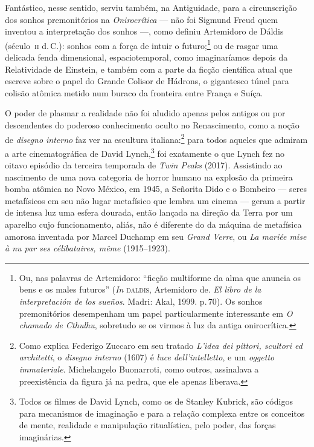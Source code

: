 Fantástico, nesse sentido, serviu também, na Antiguidade, para a
circunscrição dos sonhos premonitórios na \emph{Onirocrítica} --- não
foi Sigmund Freud quem inventou a interpretação dos sonhos ---, como
definiu Artemidoro de Dáldis (século~\textsc{ii} d.\,C.): sonhos com a força de
intuir o futuro;\footnote{Ou, nas palavras de Artemidoro: ``ficção
  multiforme da alma que anuncia os bens e os males futuros''
  (\emph{In} \textsc{daldis}, Artemidoro de. \emph{El libro de la interpretación
  de los sueños}. Madri: Akal, 1999. p.\,70). Os sonhos premonitórios
  desempenham um papel particularmente interessante em \emph{O chamado de
    Cthulhu}, sobretudo se os virmos à luz da antiga onirocrítica.} ou
de rasgar uma delicada fenda dimensional, espaciotemporal, como
imaginaríamos depois da Relatividade de Einstein, e também com a parte
da ficção científica atual que escreve sobre o papel do Grande Colisor
de Hádrons, o gigantesco túnel para colisão atômica metido num buraco da
fronteira entre França e Suíça.

O poder de plasmar a realidade não foi aludido apenas pelos antigos ou
por descendentes do poderoso conhecimento oculto no Renascimento, como a
noção de \emph{disegno interno} faz ver na escultura italiana:\footnote{Como
  explica Federigo Zuccaro em seu tratado \emph{L'idea dei
  pittori, scultori ed architetti}, o \emph{disegno interno} (1607) é
  \emph{luce dell'intelletto}, e um \emph{oggetto immateriale}.
  Michelangelo Buonarroti, como outros, assinalava a
  preexistência da figura já na pedra, que ele apenas liberava.} para
todos aqueles que admiram a arte cinematográfica de David
Lynch,\footnote{Todos os filmes de David Lynch, como os de Stanley
  Kubrick, são códigos para mecanismos de imaginação e para a relação
  complexa entre os conceitos de mente, realidade e manipulação
  ritualística, pelo poder, das forças imaginárias.} foi exatamente o
que Lynch fez no oitavo episódio da terceira temporada de
\emph{Twin Peaks} (2017). Assistindo ao nascimento de uma nova categoria
de horror humano na explosão da primeira bomba atômica no Novo México,
em 1945, a Señorita Dido e o Bombeiro --- seres metafísicos em seu
não lugar metafísico que lembra um cinema --- geram a partir de intensa
luz uma esfera dourada, então lançada na direção da Terra por um
aparelho cujo funcionamento, aliás, não é diferente do da máquina de
metafísica amorosa inventada por Marcel Duchamp em seu \emph{Grand
Verre}, ou \emph{La mariée mise à nu par ses célibataires, même}
(1915--1923).


